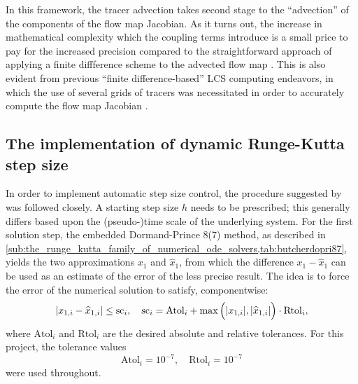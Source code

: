 In this framework, the tracer advection takes second stage to the ``advection''
of the components of the flow map Jacobian. As it turns out, the increase in
mathematical complexity which the coupling terms introduce is a small price to
pay for the increased precision compared to the straightforward approach of
applying a finite diffference scheme to the advected flow map
\parencite{oettinger2016autonomous}. This is also evident from previous
``finite difference-based'' LCS computing endeavors, in which the use of
several grids of tracers was necessitated in order to accurately compute the
flow map Jacobian \parencite{loken2017sensitivity,farazmand2012computing}.

\subsection{The implementation of dynamic Runge-Kutta step size}
\label{sub:the_implementation_of_dynamic_runge_kutta_step_size}

In order to implement automatic step size control, the procedure suggested by
\textcite[pp.167--168]{hairer1993solving} was followed closely. A starting step
size $h$ needs to be prescribed; this generally differs based upon the
(pseudo-)time scale of the underlying system. For the first solution step,
the embedded Dormand-Prince 8(7) method, as described in
\cref{sub:the_runge_kutta_family_of_numerical_ode_solvers,tab:butcherdopri87},
yields the two approximations $x_{1}$ and $\widehat{x}_{1}$, from which the
difference $x_{1}-\widehat{x}_{1}$ can be used as an estimate of the error
of the less precise result. The idea is to force the error of the numerical
solution to satisfy, componentwise:
\begin{equation}
    \label{eq:adaptivetimestep_baseline}
    \abs{x_{1,i}-\widehat{x}_{1,i}}\leq\mathrm{sc}_{i}, \quad%
    \mathrm{sc}_{i} = \mathrm{Atol}_{i}+\max\Big(\abs{x_{1,i}},%
    \abs{\widehat{x}_{1,i}}\Big)\cdot\mathrm{Rtol}_{i},
\end{equation}
where $\mathrm{Atol}_{i}$ and $\mathrm{Rtol}_{i}$ are the desired absolute
and relative tolerances. For this project, the tolerance values
\begin{equation}
    \label{eq:adaptivetimestep_tolerances}
    \mathrm{Atol}_{i} = 10^{-7}, \quad \mathrm{Rtol}_{i} = 10^{-7}
\end{equation}
were used throughout.


